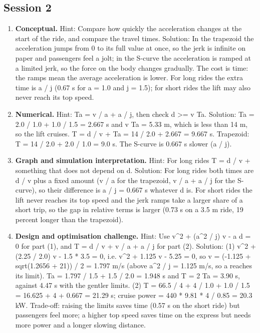 \documentclass[11pt,a4paper]{article}
\begin{document}
\subsection*{Session 2}
\begin{enumerate}[nosep]
\item \textbf{Conceptual.} Hint: Compare how quickly the acceleration changes at the start of the ride, and compare the travel times. Solution: In the trapezoid the acceleration jumps from 0 to its full value at once, so the jerk is infinite on paper and passengers feel a jolt; in the S-curve the acceleration is ramped at a limited jerk, so the force on the body changes gradually. The cost is time: the ramps mean the average acceleration is lower. For long rides the extra time is a / j (0.67 s for a = 1.0 and j = 1.5); for short rides the lift may also never reach its top speed.
\item \textbf{Numerical.} Hint: Ta = v / a + a / j, then check d \textgreater{}= v Ta. Solution: Ta = 2.0 / 1.0 + 1.0 / 1.5 = 2.667 s and v Ta = 5.33 m, which is less than 14 m, so the lift cruises. T = d / v + Ta = 14 / 2.0 + 2.667 = 9.667 s. Trapezoid: T = 14 / 2.0 + 2.0 / 1.0 = 9.0 s. The S-curve is 0.667 s slower (a / j).
\item \textbf{Graph and simulation interpretation.} Hint: For long rides T = d / v + something that does not depend on d. Solution: For long rides both times are d / v plus a fixed amount (v / a for the trapezoid, v / a + a / j for the S-curve), so their difference is a / j = 0.667 s whatever d is. For short rides the lift never reaches its top speed and the jerk ramps take a larger share of a short trip, so the gap in relative terms is larger (0.73 s on a 3.5 m ride, 19 percent longer than the trapezoid).
\item \textbf{Design and optimisation challenge.} Hint: Use v\textasciicircum{}2 + (a\textasciicircum{}2 / j) v - a d = 0 for part (1), and T = d / v + v / a + a / j for part (2). Solution: (1) v\textasciicircum{}2 + (2.25 / 2.0) v - 1.5 * 3.5 = 0, i.e. v\textasciicircum{}2 + 1.125 v - 5.25 = 0, so v = (-1.125 + sqrt(1.2656 + 21)) / 2 = 1.797 m/s (above a\textasciicircum{}2 / j = 1.125 m/s, so a reaches its limit). Ta = 1.797 / 1.5 + 1.5 / 2.0 = 1.948 s and T = 2 Ta = 3.90 s, against 4.47 s with the gentler limits. (2) T = 66.5 / 4 + 4 / 1.0 + 1.0 / 1.5 = 16.625 + 4 + 0.667 = 21.29 s; cruise power = 440 * 9.81 * 4 / 0.85 = 20.3 kW. Trade-off: raising the limits saves time (0.57 s on the short ride) but passengers feel more; a higher top speed saves time on the express but needs more power and a longer slowing distance.
\end{enumerate}
\end{document}
